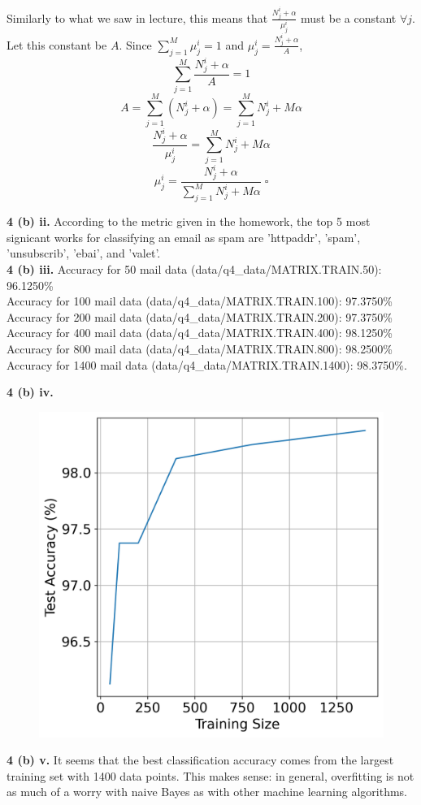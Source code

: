 \documentclass[12 pt]{article}        	%
\begin{document}
Similarly to what we saw in lecture, this means that 
$ \frac{N_{j}^{i} + \alpha}{\mu_{j}^{i}} $ must be a constant $ \forall j $. Let this constant be $ A $.
Since $ \sum_{j=1}^{M} \mu_{j}^{i} = 1 $ and $ \mu_{j}^{i} = \frac{N_{j}^{i} + \alpha}{A} $,
\[
  \sum_{j=1}^{M} \frac{N_{j}^{i} + \alpha}{A} = 1
\]
\[
  A = \sum_{j=1}^{M} ( N_{j}^{i} + \alpha )
  = \sum_{j=1}^{M} N_{j}^{i} + M \alpha
\]
\[
  \frac{N_{j}^{i} + \alpha}{\mu_{j}^{i}} = \sum_{j=1}^{M} N_{j}^{i} + M \alpha
\]
\[
  \mu_{j}^{i} = \frac{N_{j}^{i} + \alpha}{\sum_{j=1}^{M} N_{j}^{i} + M \alpha} \; \square
\]

\textbf{4 (b) ii.} 
According to the metric given in the homework, the top 5 most signicant works for 
classifying an email as spam are 'httpaddr', 'spam', 'unsubscrib', 'ebai', and 'valet'. \\

\textbf{4 (b) iii.} 
Accuracy for 50 mail data (data/q4\_data/MATRIX.TRAIN.50): 96.1250\% \\
Accuracy for 100 mail data (data/q4\_data/MATRIX.TRAIN.100): 97.3750\% \\
Accuracy for 200 mail data (data/q4\_data/MATRIX.TRAIN.200): 97.3750\% \\
Accuracy for 400 mail data (data/q4\_data/MATRIX.TRAIN.400): 98.1250\% \\
Accuracy for 800 mail data (data/q4\_data/MATRIX.TRAIN.800): 98.2500\% \\
Accuracy for 1400 mail data (data/q4\_data/MATRIX.TRAIN.1400): 98.3750\%.

\newpage

\textbf{4 (b) iv.}
\begin{figure}[h!]
  \includegraphics[width=\linewidth]{naive_bayes_spam.png}
\end{figure}

\textbf{4 (b) v.}
It seems that the best classification accuracy comes from the largest training set with 1400 data points.
This makes sense: in general, overfitting is not as much of a worry with naive Bayes as with other machine learning algorithms.
\end{document}
